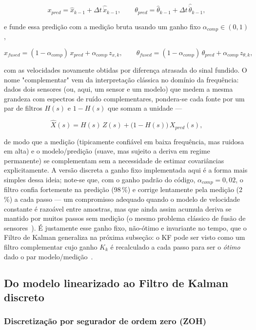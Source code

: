 \documentclass[brazil, 12pt]{article}
\begin{document}
\[
x_{pred} = \hat x_{k-1} + \Delta t\,\hat{\dot x}_{k-1},
\qquad
\theta_{pred} = \hat\theta_{k-1} + \Delta t\,\hat{\dot\theta}_{k-1},
\]

e funde essa predição com a medição bruta usando um ganho fixo
$\alpha_{comp}\in(0,1)$,

\[
x_{fused} = (1-\alpha_{comp})\,x_{pred} + \alpha_{comp}\,z_{x,k},
\qquad
\theta_{fused} = (1-\alpha_{comp})\,\theta_{pred} + \alpha_{comp}\,z_{\theta,k},
\]

com as velocidades novamente obtidas por diferença atrasada do sinal fundido.
O nome "complementar" vem da interpretação clássica no domínio da frequência:
dados dois sensores (ou, aqui, um
sensor e um modelo) que medem a mesma grandeza com espectros de ruído
complementares, pondera-se cada fonte por um par de filtros $H(s)$ e $1-H(s)$
que somam a unidade —

\[
\hat X(s) = H(s)\,Z(s) + \big(1-H(s)\big)\,X_{pred}(s),
\]

de modo que a medição (tipicamente confiável em baixa frequência, mas ruidosa
em alta) e o modelo/predição (suave, mas sujeito a deriva em regime
permanente) se complementam sem a necessidade de estimar covariâncias
explicitamente. A versão discreta a ganho fixo implementada aqui é a forma mais
simples dessa ideia; note-se que, com o ganho padrão do código,
$\alpha_{comp} = 0{,}02$, o filtro confia fortemente na predição (98\,\%) e
corrige lentamente pela medição (2\,\%) a cada passo — um compromisso adequado
quando o modelo de velocidade constante é razoável entre amostras, mas que
ainda assim acumula deriva se mantido por muitos passos sem medição (o mesmo
problema clássico de fusão de sensores~\cite{simon2006}). É justamente esse
ganho fixo, não-ótimo e invariante no tempo, que o Filtro de Kalman generaliza
na próxima subseção: o KF pode ser visto como um filtro complementar cujo
ganho $K_k$ é recalculado a cada passo para ser o \emph{ótimo} dado o par
modelo/medição~\cite{simon2006}.

\subsection{Do modelo linearizado ao Filtro de Kalman discreto}
\label{sec:kf-linear}

\subsubsection{Discretização por segurador de ordem zero (ZOH)}
\label{sec:zoh}
\end{document}
